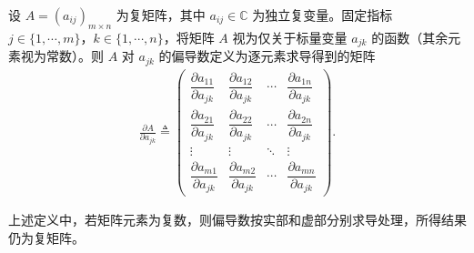 \documentclass[../../main.tex]{subfiles}%
\begin{document}
\begin{definition}
设 $A=(a_{ij})_{m\times n}$ 为复矩阵，其中 $a_{ij}\in\mathbb C$ 为独立复变量。固定指标 $j\in\{1,\cdots,m\}$，$k\in\{1,\cdots,n\}$，将矩阵 $A$ 视为仅关于标量变量 $a_{jk}$ 的函数（其余元素视为常数）。则 $A$ 对 $a_{jk}$ 的偏导数定义为逐元素求导得到的矩阵
\begin{align*}
\frac{\partial A}{\partial a_{jk}}
\triangleq
\begin{pmatrix}
\dfrac{\partial a_{11}}{\partial a_{jk}} & \dfrac{\partial a_{12}}{\partial a_{jk}} & \cdots & \dfrac{\partial a_{1n}}{\partial a_{jk}} \\[1.2ex]
\dfrac{\partial a_{21}}{\partial a_{jk}} & \dfrac{\partial a_{22}}{\partial a_{jk}} & \cdots & \dfrac{\partial a_{2n}}{\partial a_{jk}} \\
\vdots & \vdots & \ddots & \vdots \\
\dfrac{\partial a_{m1}}{\partial a_{jk}} & \dfrac{\partial a_{m2}}{\partial a_{jk}} & \cdots & \dfrac{\partial a_{mn}}{\partial a_{jk}}
\end{pmatrix}.
\end{align*}
\end{definition}
\begin{remark}
上述定义中，若矩阵元素为复数，则偏导数按实部和虚部分别求导处理，所得结果仍为复矩阵。
\end{remark}
\end{document}
